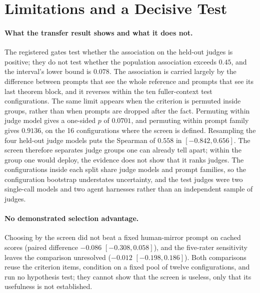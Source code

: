 \section{Limitations and a Decisive Test}\label{sec:limitations-test}
\paragraph{What the transfer result shows and what it does not.}
The registered gates test whether the association on the held-out judges is positive; they do not test whether the population association exceeds $0.45$, and the interval's lower bound is $0.078$.
The association is carried largely by the difference between prompts that see the whole reference and prompts that see its last theorem block, and it reverses within the ten fuller-context test configurations.
The same limit appears when the criterion is permuted inside groups, rather than when prompts are dropped after the fact.
Permuting within judge model gives a one-sided $p$ of $0.0701$, and permuting within prompt family gives $0.9136$, on the 16 configurations where the screen is defined.
Resampling the four held-out judge models puts the Spearman of $0.558$ in $[-0.842, 0.656]$.
The screen therefore separates judge groups one can already tell apart; within the group one would deploy, the evidence does not show that it ranks judges.
The configurations inside each split share judge models and prompt families, so the configuration bootstrap understates uncertainty, and the test judges were two single-call models and two agent harnesses rather than an independent sample of judges.

\paragraph{No demonstrated selection advantage.}
Choosing by the screen did not beat a fixed human-mirror prompt on cached scores (paired difference $-0.086$ $[-0.308, 0.058]$), and the five-rater sensitivity leaves the comparison unresolved ($-0.012$ $[-0.198, 0.186]$).
Both comparisons reuse the criterion items, condition on a fixed pool of twelve configurations, and run no hypothesis test; they cannot show that the screen is useless, only that its usefulness is not established.


